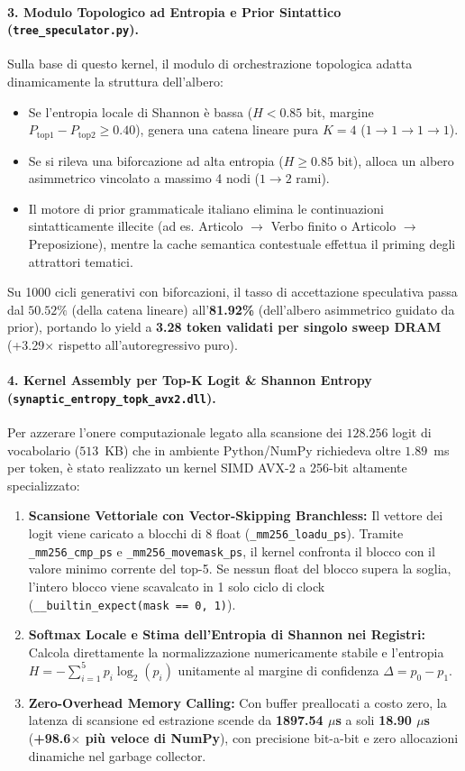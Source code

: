 \documentclass[10pt,a4paper]{article}
\theoremstyle{definition}
\begin{document}
\paragraph{3. Modulo Topologico ad Entropia e Prior Sintattico (\texttt{tree\_speculator.py}).}
Sulla base di questo kernel, il modulo di orchestrazione topologica adatta dinamicamente la struttura dell'albero:
\begin{itemize}[leftmargin=1.5em]
    \item Se l'entropia locale di Shannon è bassa ($H < 0.85$ bit, margine $P_{\text{top1}} - P_{\text{top2}} \ge 0.40$), genera una catena lineare pura $K=4$ ($1 \to 1 \to 1 \to 1$).
    \item Se si rileva una biforcazione ad alta entropia ($H \ge 0.85$ bit), alloca un albero asimmetrico vincolato a massimo 4 nodi ($1 \to 2$ rami).
    \item Il motore di prior grammaticale italiano elimina le continuazioni sintatticamente illecite (ad es. Articolo $\to$ Verbo finito o Articolo $\to$ Preposizione), mentre la cache semantica contestuale effettua il priming degli attrattori tematici.
\end{itemize}
Su 1000 cicli generativi con biforcazioni, il tasso di accettazione speculativa passa dal $50.52\%$ (della catena lineare) all'\textbf{81.92\%} (dell'albero asimmetrico guidato da prior), portando lo yield a \textbf{3.28 token validati per singolo sweep DRAM} (+3.29$\times$ rispetto all'autoregressivo puro).

\paragraph{4. Kernel Assembly per Top-K Logit \& Shannon Entropy (\texttt{synaptic\_entropy\_topk\_avx2.dll}).}
Per azzerare l'onere computazionale legato alla scansione dei $128.256$ logit di vocabolario ($513$~KB) che in ambiente Python/NumPy richiedeva oltre $1.89$~ms per token, è stato realizzato un kernel SIMD AVX-2 a 256-bit altamente specializzato:
\begin{enumerate}[leftmargin=1.5em]
    \item \textbf{Scansione Vettoriale con Vector-Skipping Branchless:} Il vettore dei logit viene caricato a blocchi di 8 float (\texttt{\_mm256\_loadu\_ps}). Tramite \texttt{\_mm256\_cmp\_ps} e \texttt{\_mm256\_movemask\_ps}, il kernel confronta il blocco con il valore minimo corrente del top-5. Se nessun float del blocco supera la soglia, l'intero blocco viene scavalcato in 1 solo ciclo di clock (\texttt{\_\_builtin\_expect(mask == 0, 1)}).
    \item \textbf{Softmax Locale e Stima dell'Entropia di Shannon nei Registri:} Calcola direttamente la normalizzazione numericamente stabile e l'entropia $H = -\sum_{i=1}^5 p_i \log_2(p_i)$ unitamente al margine di confidenza $\Delta = p_0 - p_1$.
    \item \textbf{Zero-Overhead Memory Calling:} Con buffer preallocati a costo zero, la latenza di scansione ed estrazione scende da \textbf{1897.54 $\mu$s} a soli \textbf{18.90 $\mu$s} (\textbf{+98.6$\times$ più veloce di NumPy}), con precisione bit-a-bit e zero allocazioni dinamiche nel garbage collector.
\end{enumerate}
\end{document}
